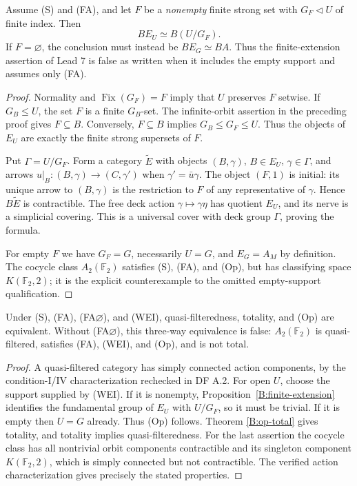 \begin{proposition}
\label{B:finite-extension}
Assume (S) and (FA), and let $F$ be a \emph{nonempty} finite strong
set with $G_F\triangleleft U$ of finite index. Then
\[
 BE_U\simeq B(U/G_F).
\]
If $F=\varnothing$, the conclusion must instead be $BE_G\simeq BA$.
Thus the finite-extension assertion of Lead 7 is false as written
when it includes the empty support and assumes only (FA).
\end{proposition}
\begin{proof}
Normality and $\operatorname{Fix}(G_F)=F$ imply that $U$ preserves
$F$ setwise. If $G_B\leq U$, the set $F$ is a finite $G_B$-set.
The infinite-orbit assertion in the preceding proof gives $F\subseteq B$.
Conversely, $F\subseteq B$ implies $G_B\leq G_F\leq U$. Thus the
objects of $E_U$ are exactly the finite strong supersets of $F$.

Put $\Gamma=U/G_F$. Form a category $\widetilde E$ with objects
$(B,\gamma)$, $B\in E_U$, $\gamma\in\Gamma$, and arrows
$u|_B:(B,\gamma)\to(C,\gamma')$ when
$\gamma'=\bar u\gamma$. The object $(F,1)$ is initial: its unique
arrow to $(B,\gamma)$ is the restriction to $F$ of any representative
of $\gamma$. Hence $B\widetilde E$ is contractible. The free deck
action $\gamma\mapsto\gamma\eta$ has quotient $E_U$, and its nerve
is a simplicial covering. This is a universal cover with deck group
$\Gamma$, proving the formula.

For empty $F$ we have $G_F=G$, necessarily $U=G$, and $E_G=A_M$ by
definition. The cocycle class $A_2(\mathbb F_2)$ satisfies (S), (FA),
and (Op), but has classifying space $K(\mathbb F_2,2)$; it is the
explicit counterexample to the omitted empty-support qualification.
\end{proof}

\begin{corollary}
\label{B:wei}
Under (S), (FA), (FA$\varnothing$), and (WEI), quasi-filteredness,
totality, and (Op) are equivalent. Without (FA$\varnothing$), this
three-way equivalence is false: $A_2(\mathbb F_2)$ is quasi-filtered,
satisfies (FA), (WEI), and (Op), and is not total.
\end{corollary}
\begin{proof}
A quasi-filtered category has simply connected action components,
by the condition-I/IV characterization rechecked in DF A.2.
For open $U$, choose the support supplied by (WEI). If it is
nonempty, Proposition~\ref{B:finite-extension} identifies the
fundamental group of $E_U$ with $U/G_F$, so it must be trivial.
If it is empty then $U=G$ already. Thus (Op) follows. Theorem
\ref{B:op-total} gives totality, and totality implies
quasi-filteredness. For the last assertion the cocycle class has
all nontrivial orbit components contractible and its singleton
component $K(\mathbb F_2,2)$, which is simply connected but not
contractible. The verified action characterization gives precisely
the stated properties.
\end{proof}



